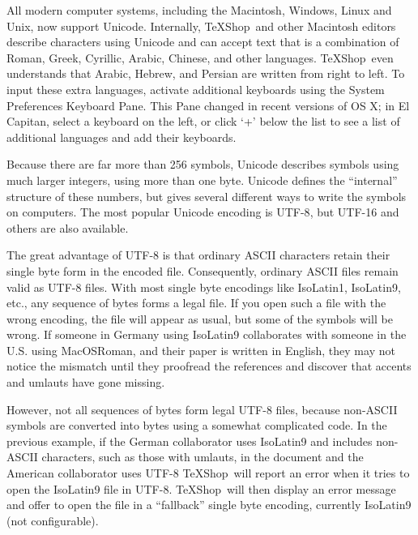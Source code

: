 \documentclass[letterpaper,11pt]{article}
\newcommand{\TS}{\textsf{\TeX Shop}}
\newcommand{\acr}[1]{\textsf{#1}}
\newcommand{\cmd}[1]{\textsf{#1}}
\begin{document}
All modern computer systems, including the Macintosh, Windows, Linux and Unix, now support \acr{Unicode}. Internally, \TS\ and other Macintosh editors describe characters using \acr{Unicode} and can accept text that is a combination of Roman, Greek, Cyrillic, Arabic, Chinese, and other languages. \TS\ even understands that Arabic, Hebrew, and Persian are written from right to left. To input these extra languages, activate additional keyboards using the \cmd{System Preferences} \cmd{Keyboard} Pane. This Pane changed in recent versions of \acr{OS X}; in \acr{El Capitan}, select a keyboard on the left, or click `+' below the list to see a list of additional languages and add their keyboards.

Because there are far more than 256 symbols, Unicode describes symbols using much larger integers, using more than one byte. Unicode defines the ``internal'' structure of these numbers, but gives several different ways to write the symbols on computers. The most popular Unicode encoding is \acr{UTF-8}, but \acr{UTF-16} and others are also available.

The great advantage of \acr{UTF-8} is that ordinary \acr{ASCII} characters retain their single byte form in the encoded file. Consequently, ordinary \acr{ASCII} files remain valid as \acr{UTF-8} files. With most single byte encodings like \acr{IsoLatin1}, \acr{IsoLatin9}, etc., any sequence of bytes forms a legal file. If you open such a file with the wrong encoding, the file will appear as usual, but some of the symbols will be wrong. If someone in Germany using \acr{IsoLatin9} collaborates with someone in the U.S. using \acr{MacOSRoman}, and their paper is written in English, they may not notice the mismatch until they proofread the references and discover that accents and umlauts have gone missing.

However, not all sequences of bytes form legal \acr{UTF-8} files, because non-\acr{ASCII} symbols are converted into bytes using a somewhat complicated code. In the previous example, if the German collaborator uses \acr{IsoLatin9} and includes non-\acr{ASCII} characters, such as those with umlauts, in the document and the American collaborator uses \acr{UTF-8} \TS\ will report an error when it tries to open the \acr{IsoLatin9} file in \acr{UTF-8}. \TS\ will then display an error message and  offer to open the file in a ``fallback'' single byte encoding, currently \acr{IsoLatin9} (not configurable).
\end{document}
